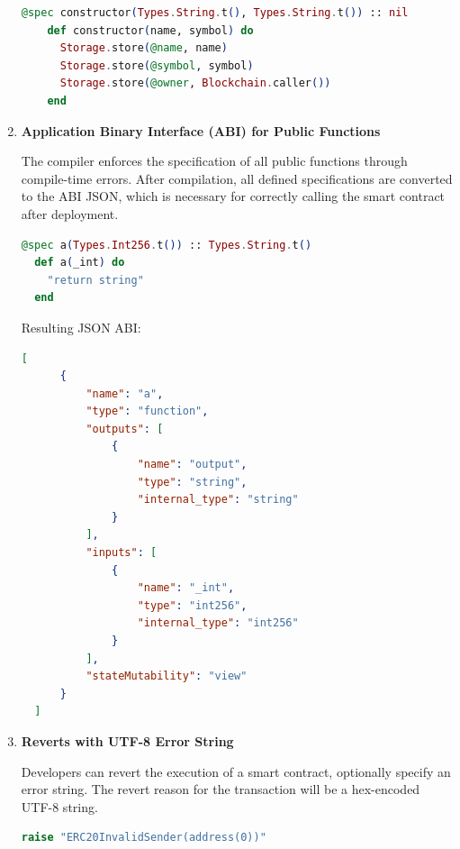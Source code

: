 \begin{enumerate}
  \begin{lstlisting}[caption={Constructor}, language=elixir, label={lst:calldata_decoding_recursive}]
    @spec constructor(Types.String.t(), Types.String.t()) :: nil
    def constructor(name, symbol) do
      Storage.store(@name, name)
      Storage.store(@symbol, symbol)
      Storage.store(@owner, Blockchain.caller())
    end
  \end{lstlisting}
  
  \item \textbf{Application Binary Interface (ABI) for Public Functions}
  
  The compiler enforces the specification of all public functions through compile-time errors. After compilation, all defined specifications are converted to the ABI JSON, which is necessary for correctly calling the smart contract after deployment.

  \begin{lstlisting}[caption={@spec}, language=elixir, label={lst:calldata_decoding_recursive}]
  @spec a(Types.Int256.t()) :: Types.String.t()
  def a(_int) do
    "return string"
  end
  \end{lstlisting}
  
  Resulting JSON ABI:
  \begin{lstlisting}[caption={ABI }, language=json, label={lst:calldata_decoding_recursive}]
    [
      {
          "name": "a",
          "type": "function",
          "outputs": [
              {
                  "name": "output",
                  "type": "string",
                  "internal_type": "string"
              }
          ],
          "inputs": [
              {
                  "name": "_int",
                  "type": "int256",
                  "internal_type": "int256"
              }
          ],
          "stateMutability": "view"
      }
  ]
  \end{lstlisting}
  
  \item \textbf{Reverts with UTF-8 Error String}

  Developers can revert the execution of a smart contract, optionally specify an error string. The revert reason for the transaction will be a hex-encoded UTF-8 string.

  \begin{lstlisting}[caption={Reverts}, language=elixir, label={lst:calldata_decoding_recursive}]
    raise "ERC20InvalidSender(address(0))"
  \end{lstlisting}
\end{enumerate}

